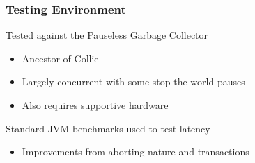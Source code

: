 \documentclass{beamer}
\newcommand{\linespace}{\vskip 0.25cm}
\begin{document}
\begin{frame}

\frametitle{Testing Environment}

Tested against the Pauseless Garbage Collector
\begin{itemize}
\item Ancestor of Collie
\item Largely concurrent with some stop-the-world pauses
\item Also requires supportive hardware
\end{itemize}

\linespace
\linespace

Standard JVM benchmarks used to test latency
\begin{itemize}
\item Improvements from aborting nature and transactions
\end{itemize}

\end{frame}
\end{document}
